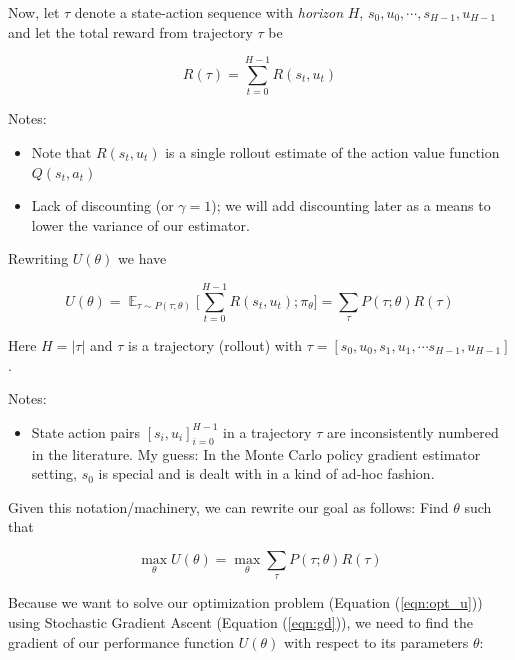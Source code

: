 \documentclass[11pt, oneside]{article}					%
\DeclareMathOperator{\E}{\mathbb{E}}
\begin{document}
\bigskip
\noindent
Now, let $\tau$ denote a state-action sequence with
\emph{horizon} $H$, $s_0,u_0,\cdots,s_{H - 1},u_{H - 1}$ and let
the total reward from trajectory $\tau$ be

\bigskip
\begin{equation*}
R(\tau) = \sum\limits_{t = 0}^{H - 1} R(s_t,u_t)
\end{equation*}

\noindent
Notes:
\begin{itemize}
\item Note that $R(s_t,u_t)$ is a single rollout estimate of the 
action value function $Q(s_t,a_t)$ 
\item Lack of discounting (or $\gamma = 1$); we will add
discounting later as a means to lower the variance of our
estimator. 
\end{itemize}

\bigskip
\noindent
Rewriting $U(\theta)$ we have

\bigskip
\begin{equation*}
U(\theta) = \E_{\tau \sim P(\tau;\theta)} \Bigg [\sum\limits_{t =
             0}^{H - 1} R(s_t,u_t) ; \pi_\theta \Bigg ] =
\sum\limits_{\tau}P(\tau; \theta)R(\tau) 
\end{equation*}

\bigskip
\noindent
Here $H = |\tau |$ and $\tau$ is a trajectory (rollout) with
$\tau = [s_0,u_0, s_1,u_1, \cdots s_{H-1},u_{H-1}]$.

\bigskip
\noindent
Notes:
\begin{itemize}
\item State action pairs $[s_i,u_i]^{H-1}_{i = 0}$ in a
trajectory $\tau$ are inconsistently numbered in the literature.
My guess: In the Monte Carlo policy gradient estimator setting,
$s_0$ is special and is dealt with in a kind of ad-hoc fashion.
\end{itemize}

\bigskip
\noindent
Given this notation/machinery, we can rewrite our goal as
follows: Find $\theta$ such that  

\bigskip
\begin{equation}
\label{eqn:opt_u}
\max\limits_{\theta} U(\theta) = \max\limits_{\theta}
\sum\limits_{\tau}P(\tau; \theta) R(\tau) 
\end{equation}

\bigskip
\noindent
Because we want to solve our optimization problem (Equation
(\ref{eqn:opt_u})) using Stochastic Gradient Ascent (Equation
(\ref{eqn:gd})), we need to find the gradient of our performance
function $U(\theta)$ with respect to its parameters $\theta$:
\end{document}
